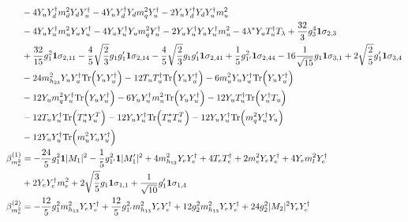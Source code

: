 {\begin{align}
 &-4 {Y_u  Y_{d}^{\dagger}  m_d^2  Y_d  Y_{u}^{\dagger}} -4 {Y_u  Y_{d}^{\dagger}  Y_d  m_q^2  Y_{u}^{\dagger}} -2 {Y_u  Y_{d}^{\dagger}  Y_d  Y_{u}^{\dagger}  m_u^2} \nonumber \\ 
 &-4 {Y_u  Y_{u}^{\dagger}  m_u^2  Y_u  Y_{u}^{\dagger}} -4 {Y_u  Y_{u}^{\dagger}  Y_u  m_q^2  Y_{u}^{\dagger}} -2 {Y_u  Y_{u}^{\dagger}  Y_u  Y_{u}^{\dagger}  m_u^2} -4 \lambda^* {Y_u  T_{u}^{\dagger}} T_{\lambda} +\frac{32}{3} g_{3}^{4} {\bf 1} \sigma_{2,3} \nonumber \\ 
 &+\frac{32}{15} g_{1}^{2} {\bf 1} \sigma_{2,11} -\frac{4}{5} \sqrt{\frac{2}{3}} g_1 g_1' {\bf 1} \sigma_{2,14} -\frac{4}{5} \sqrt{\frac{2}{3}} g_1 g_1' {\bf 1} \sigma_{2,41} +\frac{1}{5} g_{1'}^{2} {\bf 1} \sigma_{2,44} -16 \frac{1}{\sqrt{15}} g_1 {\bf 1} \sigma_{3,1} +2 \sqrt{\frac{2}{5}} g_1' {\bf 1} \sigma_{3,4} \nonumber \\ 
 &-24 m_{h_{23}}^2 {Y_u  Y_{u}^{\dagger}} \mbox{Tr}\Big({Y_u  Y_{u}^{\dagger}}\Big) -12 {T_u  T_{u}^{\dagger}} \mbox{Tr}\Big({Y_u  Y_{u}^{\dagger}}\Big) -6 {m_u^2  Y_u  Y_{u}^{\dagger}} \mbox{Tr}\Big({Y_u  Y_{u}^{\dagger}}\Big) \nonumber \\ 
 &-12 {Y_u  m_q^2  Y_{u}^{\dagger}} \mbox{Tr}\Big({Y_u  Y_{u}^{\dagger}}\Big) -6 {Y_u  Y_{u}^{\dagger}  m_u^2} \mbox{Tr}\Big({Y_u  Y_{u}^{\dagger}}\Big) -12 {Y_u  T_{u}^{\dagger}} \mbox{Tr}\Big({Y_{u}^{\dagger}  T_u}\Big) \nonumber \\ 
 &-12 {T_u  Y_{u}^{\dagger}} \mbox{Tr}\Big({T_u^*  Y_{u}^{T}}\Big) -12 {Y_u  Y_{u}^{\dagger}} \mbox{Tr}\Big({T_u^*  T_{u}^{T}}\Big) -12 {Y_u  Y_{u}^{\dagger}} \mbox{Tr}\Big({m_q^2  Y_{u}^{\dagger}  Y_u}\Big) \nonumber \\ 
 &-12 {Y_u  Y_{u}^{\dagger}} \mbox{Tr}\Big({m_u^2  Y_u  Y_{u}^{\dagger}}\Big) \\ 
\beta_{m_e^2}^{(1)} & =  
-\frac{24}{5} g_{1}^{2} {\bf 1} |M_1|^2 -\frac{1}{5} g_{1'}^{2} {\bf 1} |M_1'|^2 +4 m_{h_{13}}^2 {Y_e  Y_{e}^{\dagger}} +4 {T_e  T_{e}^{\dagger}} +2 {m_e^2  Y_e  Y_{e}^{\dagger}} +4 {Y_e  m_l^2  Y_{e}^{\dagger}} \nonumber \\ 
 &+2 {Y_e  Y_{e}^{\dagger}  m_e^2} +2 \sqrt{\frac{3}{5}} g_1 {\bf 1} \sigma_{1,1} +\frac{1}{\sqrt{10}} g_1' {\bf 1} \sigma_{1,4} \\ 
\beta_{m_e^2}^{(2)} & =  
-\frac{12}{5} g_{1}^{2} m_{h_{13}}^2 {Y_e  Y_{e}^{\dagger}} +\frac{12}{5} g_{1'}^{2} m_{h_{13}}^2 {Y_e  Y_{e}^{\dagger}} +12 g_{2}^{2} m_{h_{13}}^2 {Y_e  Y_{e}^{\dagger}} +24 g_{2}^{2} |M_2|^2 {Y_e  Y_{e}^{\dagger}} \nonumber \\ 

\end{align}}
